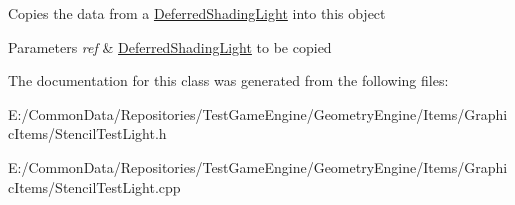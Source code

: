 Copies the data from a \mbox{\hyperlink{class_geometry_engine_1_1_geometry_world_item_1_1_geometry_light_1_1_deferred_shading_light}{Deferred\+Shading\+Light}} into this object 
\begin{DoxyParams}{Parameters}
{\em ref} & \mbox{\hyperlink{class_geometry_engine_1_1_geometry_world_item_1_1_geometry_light_1_1_deferred_shading_light}{Deferred\+Shading\+Light}} to be copied \\
\hline
\end{DoxyParams}


The documentation for this class was generated from the following files\+:\begin{DoxyCompactItemize}
\item 
E\+:/\+Common\+Data/\+Repositories/\+Test\+Game\+Engine/\+Geometry\+Engine/\+Items/\+Graphic\+Items/Stencil\+Test\+Light.\+h\item 
E\+:/\+Common\+Data/\+Repositories/\+Test\+Game\+Engine/\+Geometry\+Engine/\+Items/\+Graphic\+Items/Stencil\+Test\+Light.\+cpp\end{DoxyCompactItemize}
